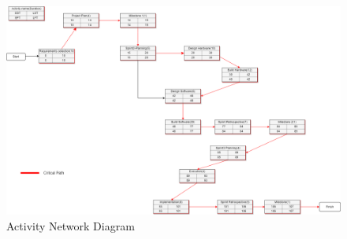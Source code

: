     \begin{figure}[H]
      \includegraphics[width=\linewidth]{graphics/AND.drawio.png}
      \caption{Activity Network Diagram}
      \label{fig:activity_network_diagram}
    \end{figure}
